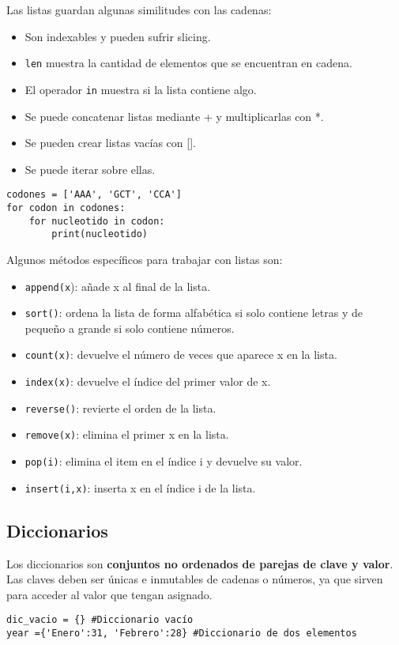 Las listas guardan algunas similitudes con las cadenas: \begin{itemize}
\item Son indexables y pueden sufrir slicing.
\item \texttt{len} muestra la cantidad de elementos que se encuentran en cadena.
\item El operador \texttt{in} muestra si la lista contiene algo.
\item Se puede concatenar listas mediante + y multiplicarlas con *.
\item Se pueden crear listas vacías con [].
\item Se puede iterar sobre ellas.
\end{itemize}
\begin{lstlisting}
codones = ['AAA', 'GCT', 'CCA']
for codon in codones:
	for nucleotido in codon:
		print(nucleotido)
\end{lstlisting}

Algunos métodos específicos para trabajar con listas son:
\begin{itemize}
\item \texttt{append(x}): añade x al final de la lista.
\item\texttt{sort()}: ordena la lista de forma alfabética si solo contiene letras y de pequeño a grande si solo contiene números. 
\item \texttt{count(x)}: devuelve el número de veces que aparece x en la lista.
\item \texttt{index(x)}: devuelve el índice del primer valor de x.
\item \texttt{reverse()}: revierte el orden de la lista.
\item \texttt{remove(x)}: elimina el primer x en la lista.
\item \texttt{pop(i)}: elimina el item en el índice i y devuelve su valor.
\item \texttt{insert(i,x)}: inserta x en el índice i de la lista.
\end{itemize}

\subsection{Diccionarios}
Los diccionarios son \textbf{conjuntos no ordenados de parejas de clave y valor}. Las claves deben ser únicas e inmutables de cadenas o números, ya que sirven para acceder al valor que tengan asignado. 
\begin{lstlisting}
dic_vacio = {} #Diccionario vacío
year ={'Enero':31, 'Febrero':28} #Diccionario de dos elementos
\end{lstlisting}

